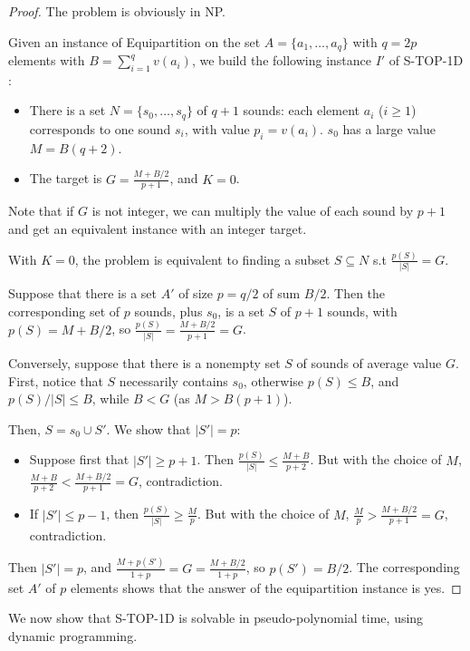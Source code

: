 \documentclass[a4paper]{book}
\newtheorem{proof}{\noindent{\bf Proof.} }
\newcommand{\statoned}{{\sc S-TOP-1D }}
\begin{document}
\begin{proof}
The problem is obviously in NP. 

Given an instance of {\sc Equipartition} on the set $A=\{a_1,\dots,a_q\}$ with $q=2p$ elements with $B=\sum_{i=1}^q v(a_i)$, we build the following instance $I'$ of \statoned:
\begin{itemize}
\item There is a set $N=\{s_0,\dots,s_q\}$ of $q+1$ sounds: each element $a_i$ ($i\geq 1$) corresponds to one sound $s_i$, with value $p_i=v(a_i)$. $s_0$ has a large value
$M=B(q+2)$. 
\item The target is $G= \frac{M+B/2}{p+1}$, and $K=0$. 
\end{itemize}

Note that if $G$ is not integer, we can multiply the value of each sound by $p+1$ and get an equivalent instance with an integer target.

With $K=0$, the problem is equivalent to finding a subset $S \subseteq N$ s.t $ \frac{p(S)}{|S|} = G$. 

Suppose that there is a set $A'$ of size $p=q/2$ of sum $B/2$. Then the corresponding set of $p$ sounds, plus $s_0$, is a set $S$ of $p+1$ sounds, with $p(S)=M+B/2$, so  $\frac{p(S)}{|S|}=\frac{M+B/2}{p+1}=G$.

Conversely, suppose that there is a nonempty  set $S$ of sounds of average value $G$. First, notice that $S$ necessarily contains $s_0$, otherwise  $p(S)\leq B$, and $p(S)/|S|\leq B$, while $B<G$ (as $M>B(p+1)$).

Then, $S=s_0\cup S'$. We show that $|S'|=p$:
\begin{itemize}
    \item Suppose first that $|S'|\geq p+1$. Then $\frac{p(S)}{|S|}\leq \frac{M+B}{p+2}$. But with the choice of $M$, $\frac{M+B}{p+2}<\frac{M+B/2}{p+1}=G$, contradiction.
    \item If $|S'|\leq p-1$, then $\frac{p(S)}{|S|}\geq \frac{M}{p}$. But with the choice of $M$, $\frac{M}{p}>\frac{M+B/2}{p+1}=G$, contradiction.
\end{itemize}
Then $|S'|=p$, and $\frac{M+p(S')}{1+p}=G=\frac{M+B/2}{1+p}$, so $p(S')=B/2$. The corresponding set $A'$ of $p$ elements shows that the answer of the equipartition instance is yes.
\end{proof}

We now show that \statoned is solvable in pseudo-polynomial time, using dynamic programming. 
\end{document}
